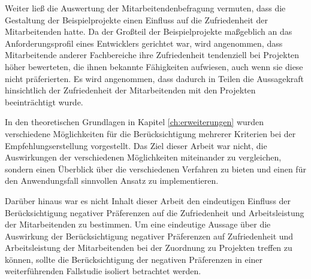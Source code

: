 
Weiter ließ die Auswertung der Mitarbeitendenbefragung vermuten, dass die Gestaltung der Beispielprojekte einen Einfluss auf die Zufriedenheit der Mitarbeitenden hatte.
Da der Großteil der Beispielprojekte maßgeblich an das Anforderungsprofil eines Entwicklers gerichtet war, wird angenommen, dass Mitarbeitende anderer Fachbereiche ihre Zufriedenheit tendenziell bei Projekten höher bewerteten, die ihnen bekannte Fähigkeiten aufwiesen, auch wenn sie diese nicht präferierten.
Es wird angenommen, dass dadurch in Teilen die Aussagekraft hinsichtlich der Zufriedenheit der Mitarbeitenden mit den Projekten beeinträchtigt wurde.

In den theoretischen Grundlagen in Kapitel \ref{ch:erweiterungen} wurden verschiedene Möglichkeiten für die Berücksichtigung mehrerer Kriterien bei der Empfehlungserstellung vorgestellt.
Das Ziel dieser Arbeit war nicht, die Auswirkungen der verschiedenen Möglichkeiten miteinander zu vergleichen, sondern einen Überblick über die verschiedenen Verfahren zu bieten und einen für den Anwendungsfall sinnvollen Ansatz zu implementieren.

Darüber hinaus war es nicht Inhalt dieser Arbeit den eindeutigen Einfluss der Berücksichtigung negativer Präferenzen auf die Zufriedenheit und Arbeitsleistung der Mitarbeitenden zu bestimmen.
Um eine eindeutige Aussage über die Auswirkung der Berücksichtigung negativer Präferenzen auf Zufriedenheit und Arbeitsleistung der Mitarbeitenden bei der Zuordnung zu Projekten treffen zu können, sollte die Berücksichtigung der negativen Präferenzen in einer weiterführenden Fallstudie isoliert betrachtet werden.

